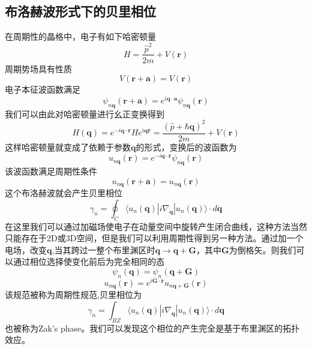 \documentclass{article}
\begin{document}
\subsection{布洛赫波形式下的贝里相位}
在周期性的晶格中，电子有如下哈密顿量
\begin{equation}
	H=\frac{\hat{p}^2}{2m}+V(\boldsymbol{r})
\end{equation}
周期势场具有性质
\begin{equation}
	V(\boldsymbol{r}+\boldsymbol{a})=V(\boldsymbol{r})
\end{equation}
电子本征波函数满足
\begin{equation}
	\psi_{n\boldsymbol{q}}(\boldsymbol{r}+\boldsymbol{a})=e^{i\boldsymbol{q}\cdot\boldsymbol{a}}\psi_{n\boldsymbol{q}}(\boldsymbol{r})
\end{equation}
我们可以由此对哈密顿量进行幺正变换得到
\begin{equation}
	H(\boldsymbol{q})=e^{-i\boldsymbol{q}\cdot\boldsymbol{r}}He^{i\boldsymbol{q}\boldsymbol{r}}=\frac{(\hat{p}+\hbar\boldsymbol{q})^2}{2m}+V(\boldsymbol{r})
\end{equation}
这样哈密顿量就变成了依赖于参数$ \boldsymbol{q} $的形式，变换后的波函数为
\begin{equation}
	u_{n\boldsymbol{q}}(\boldsymbol{r})=e^{-i\boldsymbol{q}\cdot\boldsymbol{r}}\psi_{n\boldsymbol{q}}(\boldsymbol{r})
\end{equation}
该波函数满足周期性条件
\begin{equation}
	u_{n\boldsymbol{q}}(\boldsymbol{r}+\boldsymbol{a})=u_{n\boldsymbol{q}}(\boldsymbol{r})
\end{equation}
这个布洛赫波就会产生贝里相位
\begin{equation}
	\gamma_n=\oint_C \langle u_n(\boldsymbol{q})|i\nabla_{\boldsymbol{q}}|u_n(\boldsymbol{q})\rangle \cdot d\boldsymbol{q}
\end{equation}
在这里我们可以通过加磁场使电子在动量空间中旋转产生闭合曲线，这种方法当然只能存在于2D或3D空间，但是我们可以利用周期性得到另一种方法。通过加一个电场，改变$ \boldsymbol{q} $,当其跨过一整个布里渊区时$ \boldsymbol{q}\rightarrow \boldsymbol{q}+\boldsymbol{G} $，其中$ \boldsymbol{G} $为倒格矢。则我们可以通过相位选择使变化前后为完全相同的态
\begin{equation}
	\psi_{n}(\boldsymbol{q})=\psi_{n}(\boldsymbol{q}+\boldsymbol{G})
\end{equation}
\begin{equation}
	u_{n\boldsymbol{q}}(\boldsymbol{r})=e^{i\boldsymbol{G}\cdot\boldsymbol{r}}u_{n\boldsymbol{q}+\boldsymbol{G}}(\boldsymbol{r})
\end{equation}
该规范被称为周期性规范,贝里相位为
\begin{equation}
	\gamma_n=\int_{BZ} \langle u_n(\boldsymbol{q})|i\nabla_{\boldsymbol{q}}|u_n(\boldsymbol{q})\rangle \cdot d\boldsymbol{q}
\end{equation}
也被称为Zak's phase。我们可以发现这个相位的产生完全是基于布里渊区的拓扑效应。
\end{document}
